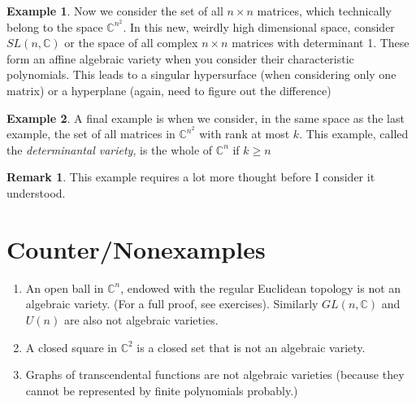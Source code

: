 \documentclass[12pt]{book}
\theoremstyle{definition}
\newtheorem{eg}{Example}[chapter]
\newtheorem*{rem}{Remark}
\begin{document}
\begin{eg}
Now we consider the set of all $n \times n$ matrices, which technically belong to the space $\mathbb{C}^{n^2}$. In this new, weirdly high dimensional space, consider $SL(n, \mathbb{C})$ or the space of all complex $n\times n$ matrices with determinant 1. These form an affine algebraic variety when you consider their characteristic polynomials. This leads to a singular hypersurface (when considering only one matrix) or a hyperplane (again, need to figure out the difference)
\end{eg}
\begin{eg}
    A final example is when we consider, in the same space as the last example, the set of all matrices in $\mathbb{C}^{n^2}$ with rank at most $k$. This example, called the \textit{determinantal variety}, is the whole of $\mathbb{C}^n$ if $k \geq n$ 
    \begin{rem}
        This example requires a lot more thought before I consider it understood.
    \end{rem}
\end{eg}
\section*{Counter/Nonexamples}
\begin{enumerate}
    \item An open ball in $\mathbb{C}^n$, endowed with the regular Euclidean topology is not an algebraic variety. (For a full proof, see exercises). Similarly $GL(n, \mathbb{C})$ and $U(n)$ are also not algebraic varieties.
    \item A closed square in $\mathbb{C}^2$ is a closed set that is not an algebraic variety.
    \item Graphs of transcendental functions are not algebraic varieties (because they cannot be represented by finite polynomials probably.)
\end{enumerate}
\end{document}
